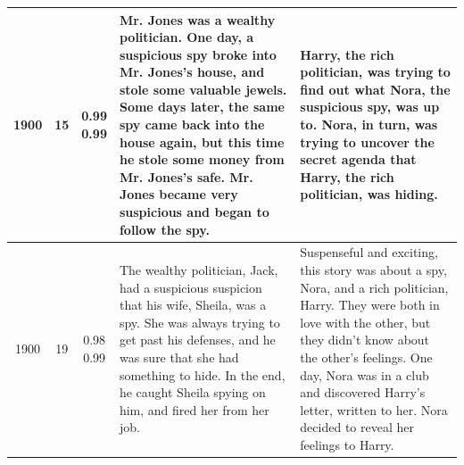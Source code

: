 \begin{table}[H]
\begin{center}
{\begin{tabular}{cccp{5cm}p{5cm}}
    \midrule
    1900 &  15 & \makecell[t]{0.99 \\ 0.99} & Mr. Jones was a wealthy politician. One day, a suspicious spy broke into Mr. Jones's house, and stole some valuable jewels. Some days later, the same spy came back into the house again, but this time he stole some money from Mr. Jones's safe. Mr. Jones became very suspicious and began to follow the spy. & Harry, the rich politician, was trying to find out what Nora, the suspicious spy, was up to. Nora, in turn, was trying to uncover the secret agenda that Harry, the rich politician, was hiding. \\
    \midrule
    1900 & 19 & \makecell[t]{0.98 \\ 0.99} & The wealthy politician, Jack, had a suspicious suspicion that his wife, Sheila, was a spy. She was always trying to get past his defenses, and he was sure that she had something to hide. In the end, he caught Sheila spying on him, and fired her from her job. & Suspenseful and exciting, this story was about a spy, Nora, and a rich politician, Harry. They were both in love with the other, but they didn't know about the other's feelings. One day, Nora was in a club and discovered Harry's letter, written to her. Nora decided to reveal her feelings to Harry. \\
    \bottomrule
  \end{tabular}}
  \end{center}
\end{table}